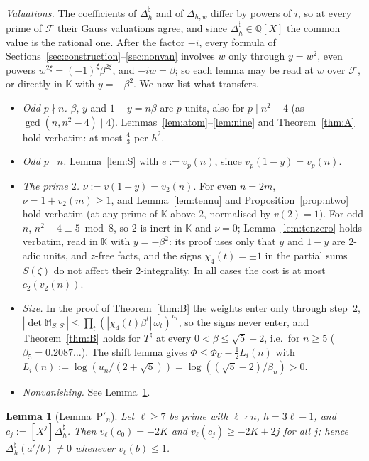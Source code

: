 \documentclass[11pt]{amsart}
\newtheorem{lemma}[theorem]{Lemma}
\theoremstyle{definition}
\theoremstyle{remark}
\numberwithin{equation}{section}
\newcommand{\QQ}{\mathbb{Q}}
\newcommand{\KK}{\mathbb{K}}
\newcommand{\cF}{\mathcal{F}}
\begin{document}
\emph{Valuations.} The coefficients of $\Delta^\natural_h$ and of $\Delta_{h,w}$ differ by powers of $i$, so at every prime
of $\cF$ their Gauss valuations agree, and since $\Delta^\natural_h\in\QQ[X]$ the common value is the rational one. After
the factor $-i$, every formula of Sections~\ref{sec:construction}--\ref{sec:nonvan} involves $w$ only through $y=w^2$,
even powers $w^{2\xi}=(-1)^\xi\beta^{2\xi}$, and $-iw=\beta$; so each lemma may be read at $w$ over $\cF$, or directly in
$\KK$ with $y=-\beta^2$. We now list what transfers.
\begin{itemize}
\item \emph{Odd $p\nmid n$.} $\beta$, $y$ and $1-y=n\beta$ are $p$-units, also for $p\mid n^2-4$ (as $\gcd(n,n^2-4)\mid4$).
  Lemmas~\ref{lem:atom}--\ref{lem:nine} and Theorem~\ref{thm:A} hold verbatim: at most $\frac43$ per $h^2$.
\item \emph{Odd $p\mid n$.} Lemma~\ref{lem:S} with $e:=v_p(n)$, since $v_p(1-y)=v_p(n)$.
\item \emph{The prime $2$.} $\nu:=v(1-y)=v_2(n)$. For even $n=2m$, $\nu=1+v_2(m)\ge1$, and Lemma~\ref{lem:tennu} and
  Proposition~\ref{prop:ntwo} hold verbatim (at any prime of $\KK$ above $2$, normalised by $v(2)=1$). For odd $n$,
  $n^2-4\equiv5\bmod8$, so $2$ is inert in $\KK$ and $\nu=0$; Lemma~\ref{lem:tenzero} holds verbatim, read in $\KK$ with
  $y=-\beta^2$: its proof uses only that $y$ and $1-y$ are $2$-adic units, and $z$-free facts, and the signs
  $\chi_4(t)=\pm1$ in the partial sums $S(\zeta)$ do not affect their $2$-integrality. In all cases the cost is at most
  $c_2(v_2(n))$.
\item \emph{Size.} In the proof of Theorem~\ref{thm:B} the weights enter only through step~2, $|\det\mathbb
  M_{S,S'}|\le\prod_t(|\chi_4(t)\beta^t|\,\omega_t)^{n_t}$, so the signs never enter, and Theorem~\ref{thm:B} holds for
  $T^\natural$ at every $0<\beta\le\sqrt5-2$, i.e.\ for $n\ge5$ ($\beta_5=0.2087\ldots$). The shift lemma gives
  $\Phi\le\Phi_U-\frac12L_i(n)$ with $L_i(n):=\log(u_n/(2+\sqrt5))=\log((\sqrt5-2)/\beta_n)>0$.
\item \emph{Nonvanishing.} See Lemma~\ref{lem:Pti}.
\end{itemize}

\begin{lemma}[Lemma~P$'_n$]\label{lem:Pti}
Let $\ell\ge7$ be prime with $\ell\nmid n$, $h=3\ell-1$, and $c_j:=[X^j]\Delta^\natural_h$. Then $v_\ell(c_0)=-2K$ and
$v_\ell(c_j)\ge-2K+2j$ for all $j$; hence $\Delta^\natural_h(a'/b)\ne0$ whenever $v_\ell(b)\le1$.
\end{lemma}
\end{document}
